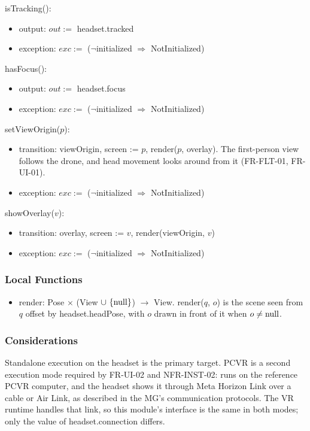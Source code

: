 \documentclass[12pt, titlepage]{article}
\newcommand{\nul}{\textnormal{null}}
\newcommand{\noinit}{$\neg$initialized $\Rightarrow$ NotInitialized}
\begin{document}
\noindent isTracking():
\begin{itemize}
\item output: $out :=$ headset.tracked
\item exception: $exc :=$ (\noinit)
\end{itemize}

\noindent hasFocus():
\begin{itemize}
\item output: $out :=$ headset.focus
\item exception: $exc :=$ (\noinit)
\end{itemize}

\noindent setViewOrigin($p$):
\begin{itemize}
\item transition: viewOrigin, screen := $p$, render($p$, overlay). The
  first-person view follows the drone, and head movement looks around from it
  (FR-FLT-01, FR-UI-01).
\item exception: $exc :=$ (\noinit)
\end{itemize}

\noindent showOverlay($v$):
\begin{itemize}
\item transition: overlay, screen := $v$, render(viewOrigin, $v$)
\item exception: $exc :=$ (\noinit)
\end{itemize}

\subsubsection{Local Functions}

\begin{itemize}
\item render: Pose $\times$ (View $\cup \ \{\nul\}$) $\rightarrow$ View.
  render($q$, $o$) is the scene seen from $q$ offset by headset.headPose, with
  $o$ drawn in front of it when $o \neq \nul$.
\end{itemize}

\subsubsection{Considerations}

Standalone execution on the headset is the primary target. PCVR is a second
execution mode required by FR-UI-02 and NFR-INST-02: \progname{} runs on the
reference PCVR computer, and the headset shows it through Meta Horizon Link
over a cable or Air Link, as described in the MG's communication protocols.
The VR runtime handles that link, so this module's interface is the same in
both modes; only the value of headset.connection differs.
\end{document}
